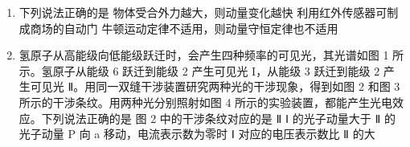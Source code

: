 \documentclass[\gkver]{gaokaozhenti}
\begin{document}
\begin{enumerate}
{ $\frac{\sin i}{\sin r}=\frac{\sin i}{\sin \beta}=n$

可得

 $i=\theta$

过 D 点做出射光的平行线，则该平行线与 AB 的夹角为  $\theta$，由几何知识可知，入射光与出射光的夹角为  $90^{\circ}$。

故选 A。
}

\item
下列说法正确的是
{物体受合外力越大，则动量变化越快}
{利用红外传感器可制成商场的自动门}
{牛顿运动定律不适用，则动量守恒定律也不适用}

\item
氢原子从高能级向低能级跃迁时，会产生四种频率的可见光，其光谱如图 1 所示。氢原子从能级 6 跃迁到能级 2 产生可见光 I，从能级 3 跃迁到能级 2 产生可见光 Ⅱ。用同一双缝干涉装置研究两种光的干涉现象，得到如图 2 和图 3 所示的干涉条纹。用两种光分别照射如图 4 所示的实验装置，都能产生光电效应。下列说法正确的是
{图 2 中的干涉条纹对应的是 Ⅱ}
{Ⅰ 的光子动量大于 Ⅱ 的光子动量}
{P 向 a 移动，电流表示数为零时 Ⅰ 对应的电压表示数比 Ⅱ 的大}
\end{enumerate}
\end{document}
